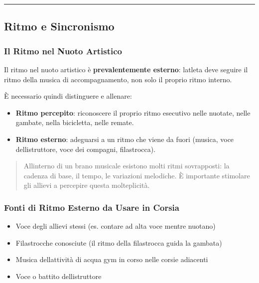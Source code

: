 \documentclass[a4paper,11pt]{article}
\providecommand{\tightlist}{%
  \setlength{\itemsep}{0pt}\setlength{\parskip}{0pt}}
\begin{document}
\begin{center}\rule{0.5\linewidth}{0.5pt}\end{center}

\subsection{Ritmo e Sincronismo}\label{ritmo-e-sincronismo}

\subsubsection{Il Ritmo nel Nuoto
      Artistico}\label{il-ritmo-nel-nuoto-artistico}

Il ritmo nel nuoto artistico è \textbf{prevalentemente esterno}:
l\textquotesingle atleta deve seguire il ritmo della musica di
accompagnamento, non solo il proprio ritmo interno.

È necessario quindi distinguere e allenare:

\begin{itemize}
      \tightlist
      \item
            \textbf{Ritmo percepito}: riconoscere il proprio ritmo esecutivo nelle
            nuotate, nelle gambate, nella bicicletta, nelle remate.
      \item
            \textbf{Ritmo esterno}: adeguarsi a un ritmo che viene da fuori
            (musica, voce dell\textquotesingle istruttore, voce dei compagni,
            filastrocca).
\end{itemize}

\begin{quote}
      All\textquotesingle interno di un brano musicale esistono molti ritmi
      sovrapposti: la cadenza di base, il tempo, le variazioni melodiche. È
      importante stimolare gli allievi a percepire questa molteplicità.
\end{quote}

\subsubsection{Fonti di Ritmo Esterno da Usare in
      Corsia}\label{fonti-di-ritmo-esterno-da-usare-in-corsia}

\begin{itemize}
      \tightlist
      \item
            Voce degli allievi stessi (es. contare ad alta voce mentre nuotano)
      \item
            Filastrocche conosciute (il ritmo della filastrocca guida la gambata)
      \item
            Musica dell\textquotesingle attività di acqua gym in corso nelle
            corsie adiacenti
      \item
            Voce o battito dell\textquotesingle istruttore
\end{itemize}
\end{document}
